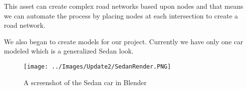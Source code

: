 This asset can create complex road networks based upon nodes and that means we can automate the process by placing nodes at each intersection to create a road network.

We also began to create models for our project.
Currently we have only one car modeled which is a generalized Sedan look.

\begin{figure}[!htbp]
    \centering
    \texttt{[image: ../Images/Update2/SedanRender.PNG]}
       \caption{A screenshot of the Sedan car in Blender}
           \label{Fig:Sedan car}
  \end{figure}

